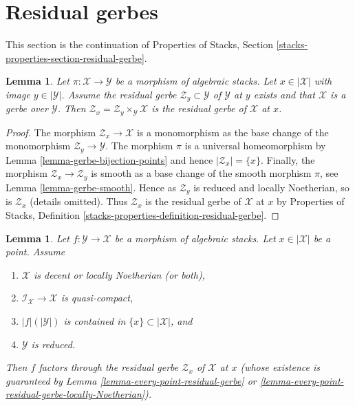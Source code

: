 \documentclass{stacks-project}
\theoremstyle{plain}
\newtheorem{lemma}[subsection]{Lemma}
\theoremstyle{definition}
\theoremstyle{remark}
\numberwithin{equation}{subsection}
\begin{document}
\section{Residual gerbes}
\label{section-residual-gerbe}

\noindent
This section is the continuation of Properties of Stacks, Section
\ref{stacks-properties-section-residual-gerbe}.

\begin{lemma}
\label{lemma-gerbe-residual-gerbe}
Let $\pi : \mathcal{X} \to \mathcal{Y}$ be a morphism of algebraic stacks.
Let $x \in |\mathcal{X}|$ with image $y \in |\mathcal{Y}|$.
Assume the residual gerbe $\mathcal{Z}_y \subset \mathcal{Y}$
of $\mathcal{Y}$ at $y$ exists and that $\mathcal{X}$ is a gerbe
over $\mathcal{Y}$. Then
$\mathcal{Z}_x = \mathcal{Z}_y \times_\mathcal{Y} \mathcal{X}$ is
the residual gerbe of $\mathcal{X}$ at $x$.
\end{lemma}

\begin{proof}
The morphism $\mathcal{Z}_x \to \mathcal{X}$ is a monomorphism as
the base change of the monomorphism $\mathcal{Z}_y \to \mathcal{Y}$.
The morphism $\pi$ is a universal homeomorphism by
Lemma \ref{lemma-gerbe-bijection-points} and hence $|\mathcal{Z}_x| = \{x\}$.
Finally, the morphism $\mathcal{Z}_x \to \mathcal{Z}_y$ is smooth
as a base change of the smooth morphism $\pi$, see
Lemma \ref{lemma-gerbe-smooth}.
Hence as $\mathcal{Z}_y$ is reduced and locally Noetherian, so
is $\mathcal{Z}_x$ (details omitted). Thus $\mathcal{Z}_x$ is
the residual gerbe of $\mathcal{X}$ at $x$ by
Properties of Stacks, Definition
\ref{stacks-properties-definition-residual-gerbe}.
\end{proof}

\begin{lemma}
\label{lemma-factor-through-residual-space}
Let $f : \mathcal{Y} \to \mathcal{X}$ be a morphism of algebraic stacks.
Let $x \in |\mathcal{X}|$ be a point. Assume
\begin{enumerate}
\item $\mathcal{X}$ is decent or locally Noetherian (or both),
\item $\mathcal{I}_\mathcal{X} \to \mathcal{X}$ is quasi-compact,
\item $|f|(|\mathcal{Y}|)$ is contained in $\{x\} \subset |\mathcal{X}|$, and
\item $\mathcal{Y}$ is reduced.
\end{enumerate}
Then $f$ factors through the residual gerbe $\mathcal{Z}_x$
of $\mathcal{X}$ at $x$ (whose existence is guaranteed by
Lemma \ref{lemma-every-point-residual-gerbe} or
\ref{lemma-every-point-residual-gerbe-locally-Noetherian}).
\end{lemma}
\end{document}

